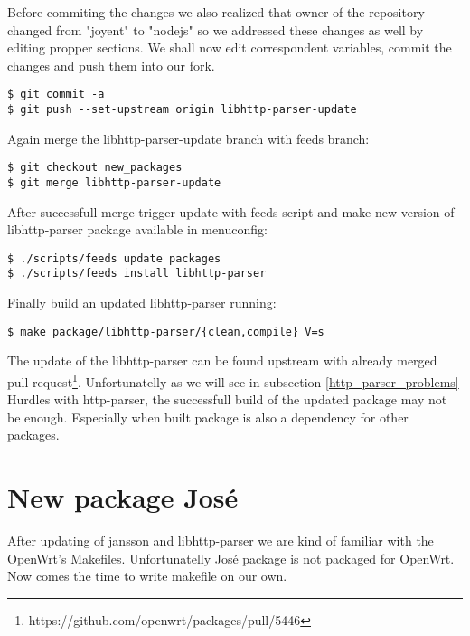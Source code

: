 Before commiting the changes we also realized that owner of the repository changed from "joyent" to "nodejs" so we addressed these changes as well by editing propper sections.
We shall now edit correspondent variables, commit the changes and push them into our fork.
\begin{lstlisting}[columns=fixed,basicstyle=\ttfamily\footnotesize,tabsize=4,backgroundcolor=\color{yellow!10}]
$ git commit -a
$ git push --set-upstream origin libhttp-parser-update
\end{lstlisting}
Again merge the libhttp-parser-update branch with feeds branch:
\begin{lstlisting}[columns=fixed,basicstyle=\ttfamily\footnotesize,tabsize=4,backgroundcolor=\color{yellow!10}]
$ git checkout new_packages
$ git merge libhttp-parser-update
\end{lstlisting}
After successfull merge trigger update with feeds script and make new version of libhttp-parser package available in menuconfig:
\begin{lstlisting}[columns=fixed,basicstyle=\ttfamily\footnotesize,tabsize=4,backgroundcolor=\color{yellow!10}]
$ ./scripts/feeds update packages
$ ./scripts/feeds install libhttp-parser
\end{lstlisting}
Finally build an updated libhttp-parser running:
\begin{lstlisting}[columns=fixed,basicstyle=\ttfamily\footnotesize,tabsize=4,backgroundcolor=\color{yellow!10}]
$ make package/libhttp-parser/{clean,compile} V=s
\end{lstlisting}
The update of the libhttp-parser can be found upstream with already merged pull-request\footnote{https://github.com/openwrt/packages/pull/5446}.
Unfortunatelly as we will see in subsection \ref{http_parser_problems} Hurdles with http-parser, the successfull build of the updated package may not be enough.
Especially when built package is also a dependency for other packages.



\section{New package José}

After updating of jansson and libhttp-parser we are kind of familiar with the OpenWrt's Makefiles.
Unfortunatelly José package is not packaged for OpenWrt.
Now comes the time to write makefile on our own.

